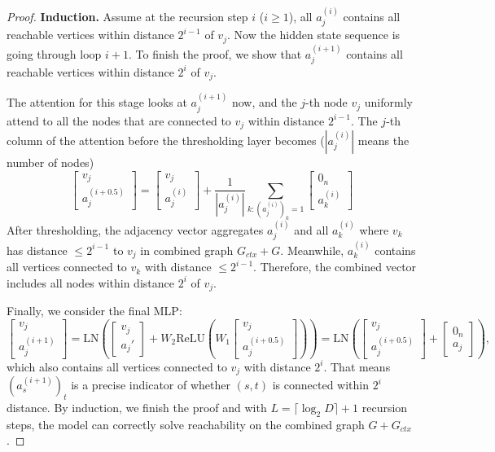 \documentclass[]{bytedance_seed}
\newcommand{\1}{\mathbf{1}}
\begin{document}
\begin{proof}
\textbf{Induction.} Assume at the recursion step $i$ ($i\ge 1$), all $a_{j}^{(i)}$ contains all reachable vertices within distance $2^{i-1}$ of $v_j$. Now the hidden state sequence is going through loop $i+1$. To finish the proof, we show that $a_{j}^{(i+1)}$ contains all reachable vertices within distance $2^{i}$ of $v_j$.

The attention for this stage looks at $a_{j}^{(i+1)}$ now, and the $j$-th node $v_j$ uniformly attend to all the nodes that are connected to $v_j$ within distance $2^{i-1}$. The $j$-th column of the attention before the thresholding layer becomes ($|a_{j}^{(i)}|$ means the number of nodes)
    $$\begin{bmatrix}
        v_j\\
        a_{j}^{(i+0.5)}
    \end{bmatrix}=\begin{bmatrix}
        v_j\\
        a_{j}^{(i)}
    \end{bmatrix}+\frac{1}{|a_{j}^{(i)}|}\sum_{k:(a_{j}^{(i)})_k=1}\begin{bmatrix}
        0_n\\
        a_{k}^{(i)}
    \end{bmatrix}$$
    After thresholding, the adjacency vector aggregates $a_j^{(i)}$ and all $a_k^{(i)}$ where $v_k$ has distance $\le 2^{i-1}$ to $v_j$ in combined graph $G_{ctx}+G$. Meanwhile, $a_k^{(i)}$ contains all vertices connected to $v_k$ with distance $\le 2^{i-1}$. Therefore, the combined vector includes all nodes within distance $2^{i}$ of $v_j$.

    Finally, we consider the final MLP:
    $$\begin{bmatrix}
        v_j\\
        a_{j}^{(i+1)}
    \end{bmatrix}=\mathrm{LN}\left(\begin{bmatrix}
        v_j\\
        a_{j}'
    \end{bmatrix}+W_2\mathrm{ReLU}\left(W_1\begin{bmatrix}
        v_j\\
        a_{j}^{(i+0.5)}
    \end{bmatrix}\right)\right)=\mathrm{LN}\left(\begin{bmatrix}
        v_j\\
        a_{j}^{(i+0.5)}
    \end{bmatrix}+\begin{bmatrix}
        0_n\\
        a_{j}
    \end{bmatrix}\right),$$ which also contains all vertices connected to $v_j$ with distance $2^i$. That means $(a_{s}^{(i+1)})_t$ is a precise indicator of whether $(s,t)$ is connected within $2^i$ distance. By induction, we finish the proof and with $L=\lceil\log_2 D\rceil+1$ recursion steps, the model can correctly solve reachability on the combined graph $G+G_{ctx}$.
\end{proof}
\end{document}

